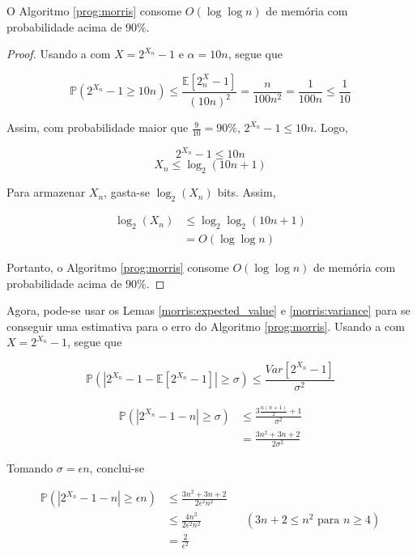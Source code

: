 \begin{lemma}
  O Algoritmo \ref{prog:morris} consome $O(\log \log n)$ de memória com probabilidade acima de $90\%$.
\end{lemma}

\begin{proof}
  Usando a  com $X = 2^{X_n} - 1$ e $\alpha = 10n$, segue que

\[ \mathbb{P}(2^{X_n} - 1 \geq 10n)  \leq \frac{\mathbb{E}[2^X_n - 1]}{(10n)^2} = \frac{n}{100n^2} = \frac{1}{100n} \leq \frac{1}{10} \]

Assim, com probabilidade maior que $\frac{9}{10} = 90\%$, $2^{X_n} - 1 \leq 10n$. Logo, 

\[ 2^{X_n} - 1 \leq 10n  \]
\[ X_n \leq \log_2(10n + 1)\]

Para armazenar $X_n$, gasta-se $\log_2(X_n)$ bits. Assim,

\begin{align*}
  \log_2(X_n) 
    &\leq \log_2\log_2(10n + 1) \\ 
    &= O(\log \log n)
\end{align*} 

Portanto, o Algoritmo \ref{prog:morris} consome $O(\log \log n)$ de memória com probabilidade acima de $90\%$.

\end{proof}

Agora, pode-se usar os Lemas \ref{morris:expected_value} e \ref{morris:variance} para se conseguir uma estimativa para o 
erro do Algoritmo \ref{prog:morris}.
Usando a  com $X = 2^{X_n} - 1$, segue que

\[ \mathbb{P}(|2^{X_n} - 1 - \mathbb{E}[2^{X_n} - 1]| \geq \sigma ) \leq \frac{Var[2^{X_n} - 1]}{\sigma^2}\]

\begin{align*}
  \mathbb{P}(|2^{X_n} - 1 - n| \geq \sigma ) 
    &\leq \frac{3\frac{n(n+1)}{2} + 1}{\sigma^2}  \\
    &= \frac{3n^2 + 3n + 2}{2\sigma^2}
\end{align*}


Tomando $\sigma = \epsilon n$, conclui-se

\begin{align*}
  \mathbb{P}(|2^{X_n} - 1 - n| \geq \epsilon n) 
    &\leq \frac{3n^2 + 3n + 2}{2 \epsilon^2 n^2}  \\
    &\leq \frac{4n^2}{2 \epsilon^2 n^2}  &&(\text{$3n + 2 \leq n^2$ para $n \geq 4$}) \\
    &= \frac{2}{\epsilon^2}
\end{align*}


